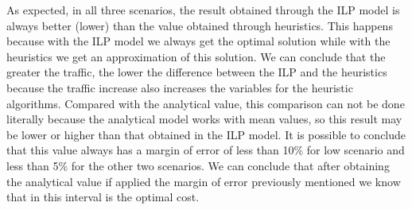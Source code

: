 As expected, in all three scenarios, the result obtained through the ILP model is always better (lower) than the value obtained through heuristics. This happens because with the ILP model we always get the optimal solution while with the heuristics we get an approximation of this solution.
We can conclude that the greater the traffic, the lower the difference between the ILP and the heuristics because the traffic increase also increases the variables for the heuristic algorithms.
Compared with the analytical value, this comparison can not be done literally because the analytical model works with mean values, so this result may be lower or higher than that obtained in the ILP model.
It is possible to conclude that this value always has a margin of error of less than 10\% for low scenario and less than 5\% for the other two scenarios.
We can conclude that after obtaining the analytical value if applied the margin of error previously mentioned we know that in this interval is the optimal cost.
